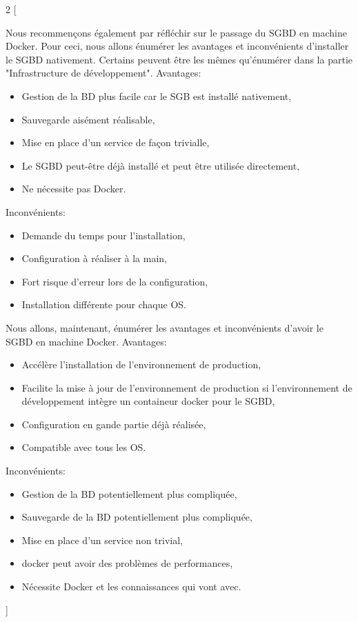 \documentclass[
    iai, %
    il, %
]{heig-tb}
\begin{document}
\begin{multicols}{2}
    [

        Nous recommençons également par réfléchir sur le passage du SGBD en machine Docker.
        Pour ceci, nous allons énumérer les avantages et inconvénients d'installer le SGBD nativement.
        Certains peuvent être les mêmes qu'énumérer dans la partie "Infrastructure de développement". %
        Avantages:
        \begin{itemize}
            \item Gestion de la BD plus facile car le SGB est installé nativement,
            \item Sauvegarde aisément réalisable,
            \item Mise en place d'un service de façon trivialle,
            \item Le SGBD peut-être déjà installé et peut être utilisée directement,
            \item Ne nécessite pas Docker.
        \end{itemize}

        Inconvénients:
        \begin{itemize}
            \item Demande du temps pour l'installation,
            \item Configuration à réaliser à la main,
            \item Fort risque d'erreur lors de la configuration,
            \item Installation différente pour chaque OS.
        \end{itemize}

        Nous allons, maintenant, énumérer les avantages et inconvénients d'avoir le SGBD en machine Docker.
        Avantages:
        \begin{itemize}
            \item Accélère l'installation de l'environnement de production,
            \item Facilite la mise à jour de l'environnement de production si l'environnement de développement intègre un containeur docker pour le SGBD,
            \item Configuration en gande partie déjà réalisée,
            \item Compatible avec tous les OS.
        \end{itemize}

        Inconvénients:
        \begin{itemize}
            \item Gestion de la BD potentiellement plus compliquée,
            \item Sauvegarde de la BD potentiellement plus compliquée,
            \item Mise en place d'un service non trivial,
            \item \Gls{docker} peut avoir des problèmes de performances, \cite{labrecque}
            \item Nécessite Docker et les connaissances qui vont avec. \cite{labrecque}
        \end{itemize}
    ]
    \blindtext\blindtext
\end{multicols}
\end{document}
